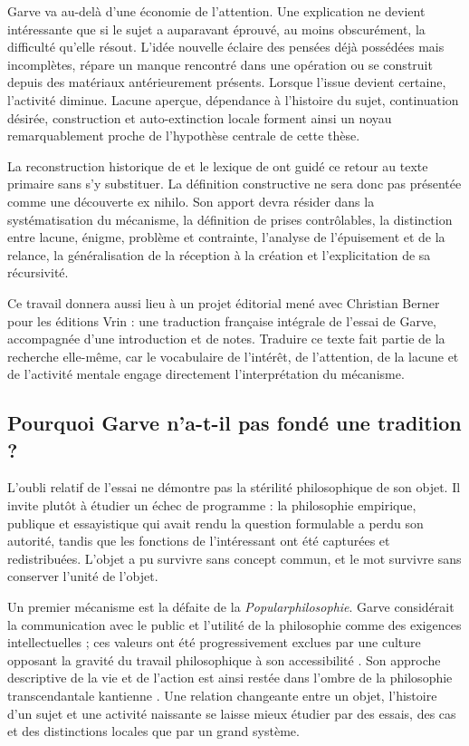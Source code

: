 \documentclass[11pt,a4paper]{article}
\begin{document}
Garve va au-delà d'une économie de l'attention. Une explication ne devient
intéressante que si le sujet a auparavant éprouvé, au moins obscurément, la
difficulté qu'elle résout. L'idée nouvelle éclaire des pensées déjà possédées
mais incomplètes, répare un manque rencontré dans une opération ou se construit
depuis des matériaux antérieurement présents. Lorsque l'issue devient certaine,
l'activité diminue. Lacune aperçue, dépendance à l'histoire du sujet,
continuation désirée, construction et auto-extinction locale forment ainsi un
noyau remarquablement proche de l'hypothèse centrale de cette thèse.

La reconstruction historique de \textcite{nannini2018garve} et le lexique de
\textcite{nannini2018interesting} ont guidé ce retour au texte primaire sans s'y
substituer. La définition constructive ne sera donc pas présentée comme une
découverte ex nihilo. Son apport devra résider dans la systématisation du
mécanisme, la définition de prises contrôlables, la distinction entre lacune,
énigme, problème et contrainte, l'analyse de l'épuisement et de la relance, la
généralisation de la réception à la création et l'explicitation de sa
récursivité.

Ce travail donnera aussi lieu à un projet éditorial mené avec Christian Berner
pour les éditions Vrin : une traduction française intégrale de l'essai de
Garve, accompagnée d'une introduction et de notes. Traduire ce texte fait partie
de la recherche elle-même, car le vocabulaire de l'intérêt, de l'attention, de
la lacune et de l'activité mentale engage directement l'interprétation du
mécanisme.

\subsection{Pourquoi Garve n'a-t-il pas fondé une tradition ?}

L'oubli relatif de l'essai ne démontre pas la stérilité philosophique de son
objet. Il invite plutôt à étudier un échec de programme : la philosophie
empirique, publique et essayistique qui avait rendu la question formulable a
perdu son autorité, tandis que les fonctions de l'intéressant ont été capturées
et redistribuées. L'objet a pu survivre sans concept commun, et le mot survivre
sans conserver l'unité de l'objet.

Un premier mécanisme est la défaite de la \emph{Popularphilosophie}. Garve
considérait la communication avec le public et l'utilité de la philosophie comme
des exigences intellectuelles ; ces valeurs ont été progressivement exclues par
une culture opposant la gravité du travail philosophique à son accessibilité
\parencite{thompson2018garve}. Son approche descriptive de la vie et de l'action
est ainsi restée dans l'ombre de la philosophie transcendantale kantienne
\parencite{bachmannmedick2008anziehungskraft}. Une relation changeante entre un
objet, l'histoire d'un sujet et une activité naissante se laisse mieux étudier
par des essais, des cas et des distinctions locales que par un grand système.
\end{document}
